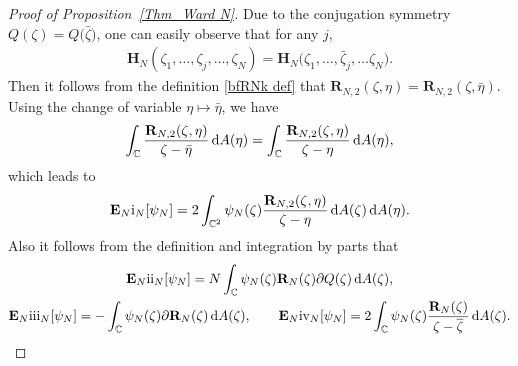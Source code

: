 \documentclass[pdftex]{sigma}
\numberwithin{equation}{section}
\newcommand{\bfR}{\mathbf{R}}
\newcommand{\C}{{\mathbb C}}
\newcommand{\E}{{\mathbf E}}
\newcommand{\Ham}{\mathbf{H}}
\newcommand{\1}{\chi}
\newcommand{\RN}[1]{%
	\textup{\uppercase\expandafter{\romannumeral#1}}%
}
\begin{document}
\begin{proof}[Proof of Proposition~\ref{Thm_Ward N}]
	Due to the conjugation symmetry $Q(\zeta)=Q\big(\bar{\zeta}\big)$, one can easily observe that for any $j$,
	\begin{gather*}
	\Ham_N(\zeta_1,\dots, \zeta_j,\dots ,\zeta_N)= \Ham_N\big(\zeta_1,\dots, \bar{\zeta}_j,\dots \zeta_N\big).
	\end{gather*}
	Then it follows from the definition \eqref{bfRNk def} that $\bfR_{N,2}(\zeta,\eta)=\bfR_{N,2}(\zeta,\bar{\eta})$.
	Using the change of variable $\eta \mapsto \bar{\eta}$, we have
	\begin{gather*}
		\int_\C \frac{ \bfR_{N,2}(\zeta,\eta)}{\zeta-\bar{\eta}} \,{\rm d}A(\eta) = \int_\C \frac{ \bfR_{N,2}(\zeta,\eta)}{\zeta-\eta} \,{\rm d}A(\eta),
	\end{gather*}
	which leads to
	\begin{gather*}
		\E_N \RN{1}_N[\psi_N]= 2\int_{ \C^2 } \psi_N(\zeta) \frac{ \bfR_{N,2}(\zeta,\eta) }{\zeta-\eta} \,{\rm d}A(\zeta) \,{\rm d}A(\eta).
	\end{gather*}
	Also it follows from the definition and integration by parts that
	\begin{gather*}
		\E_N \RN{2}_N[\psi_N]=N \int_\C \psi_N(\zeta) \bfR_{N}(\zeta)\partial Q(\zeta) \,{\rm d}A(\zeta),
		\\
		\E_N \RN{3}_N[\psi_N]=-\int_\C \psi_N(\zeta) \partial \bfR_{N}(\zeta) \,{\rm d}A(\zeta), \qquad
		\E_N \RN{4}_N[\psi_N]=2\int_\C \psi_N(\zeta) \frac{\bfR_{N}(\zeta)}{\zeta-\overline{\zeta}} \,{\rm d}A(\zeta).
	\end{gather*}
	

\end{proof}
\end{document}

